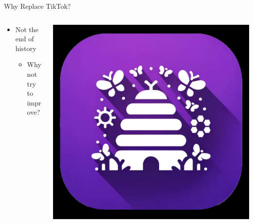 \documentclass[aspectratio=169]{beamer}
\begin{document}
\begin{frame}{Why Replace TikTok?}
\begin{columns}[T]
    \begin{column}[T]{0.5\textwidth}
        \begin{itemize}
            \item Not the end of history
            \begin{itemize}
                \item Why not try to improve?
            \end{itemize}
        \end{itemize}
    \end{column}
    \begin{column}{0.5\textwidth}
        \includegraphics[height=0.8\textheight]{imgs/app_icons/2.png}
    \end{column}
\end{columns}
\end{frame}
\end{document}
